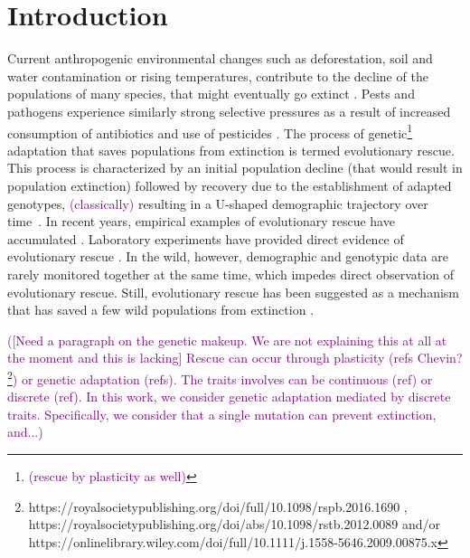 \documentclass[a4paper,11pt]{article}
\newcommand{\florence}[1]{\textcolor{purple}{(#1)}} %
\newcommand{\chg}[1]{\textcolor{change}{#1}}
\begin{document}
\section*{Introduction}

Current anthropogenic environmental changes such as deforestation, soil and water contamination or rising temperatures, contribute to the decline of the populations of many species, that might eventually go extinct \citep{bellard_2012, diniz_2019}. Pests and pathogens experience similarly strong selective pressures as a result of increased consumption of antibiotics and use of pesticides \citep{ramsayer_2013, kreiner_2018}. 
The process of genetic\footnote{\florence{rescue by plasticity as well}} adaptation that saves populations from extinction is termed evolutionary rescue. This \chg{process is characterized by an initial population decline (that would result in population extinction) followed by recovery due to the establishment of adapted genotypes, } \florence{classically} resulting in a U-shaped demographic trajectory over time~\citep{gomulkiewicz_1995}.
In recent years, empirical examples of evolutionary rescue have accumulated \citep[as reviewed by ][]{alexander_2014,carlson_2014,bell_2017}. Laboratory experiments have provided direct evidence of evolutionary rescue  \citep[e.g.][]{bell_2009, agashe_2011, lachapelle_2012, lindsey_2013, stelkens_2014}. In the wild, however, demographic and genotypic data are rarely monitored together at the same time, which impedes direct observation of evolutionary rescue. Still, evolutionary rescue has been suggested as a mechanism that has saved a few wild populations from extinction \citep[e.g.][]{vanderwal_2012, digiallonardo_2015, gignoux_2018}. 



\florence{[Need a paragraph on the genetic makeup. We are not explaining this at all at the moment and this is lacking] Rescue can occur through plasticity (refs Chevin? \footnote{https://royalsocietypublishing.org/doi/full/10.1098/rspb.2016.1690 , https://royalsocietypublishing.org/doi/abs/10.1098/rstb.2012.0089 and/or https://onlinelibrary.wiley.com/doi/full/10.1111/j.1558-5646.2009.00875.x}) or genetic adaptation (refs). The traits involves can be continuous (ref) or discrete (ref). In this work, we consider genetic adaptation mediated by discrete traits. Specifically, we consider that a single mutation can prevent extinction, and...}
\end{document}

